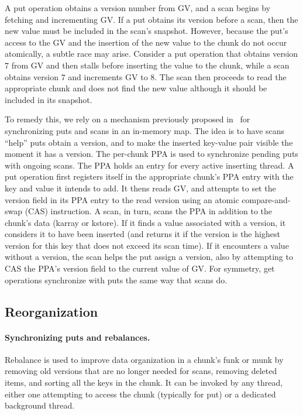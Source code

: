 A put operation obtains a version number from GV, and a scan begins by fetching and incrementing GV.
If a put obtains its version before a scan, then the new value must be included in the scan's snapshot. 
However, because the put's access to the GV and the insertion of the new value to the chunk do not occur atomically,
a subtle race may arise. Consider a put operation that obtains version $7$ from GV and then stalls before
inserting the value to the chunk, while a scan obtains version $7$ and increments GV to $8$. The scan then proceeds 
to read the appropriate chunk and does not find the new value although it should be included in its snapshot.

To remedy this, we rely on a mechanism previously proposed in~\cite{kiwi} for synchronizing puts and scans in an in-memory map.  
The idea is to have scans ``help'' puts obtain a version, and to make the inserted key-value pair visible the moment it has a version.
The per-chunk PPA is used to synchronize pending puts  with ongoing scans. 
The PPA holds an entry for every active inserting thread.
A put operation first registers itself in the appropriate chunk's PPA entry with the key and value it intends to add.
It thens reads GV, and attempts to set the version field in its PPA entry to the read version using an atomic 
compare-and-swap (CAS) instruction. A scan, in turn, scans the PPA in addition to the chunk's data (karray 
or kstore). If it finds a value associated with a version, it considers it to have been inserted (and returns it if the version is
the highest version for this key that does not exceed its scan time). If it encounters a value without a version, the scan helps the put
assign a version, also by attempting to CAS the PPA's version field to the current value of GV.
For symmetry, get operations synchronize with puts the same way that scans do. 

\subsection{Reorganization}
\label{ssec:rebalance}

\paragraph{Synchronizing puts and rebalances.}

Rebalance is used to improve data organization in a chunk's funk or munk by removing old versions that are no longer needed for scans, 
removing deleted items, and sorting all the keys in the chunk. 
It can be invoked by any thread, either one attempting to access the chunk (typically for put) or a dedicated background thread.

